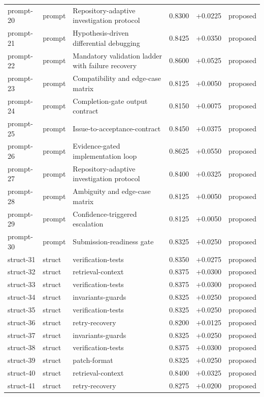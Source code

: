 \begin{center}
\begin{longtable}{llp{5.2cm}rrl}
prompt-20 & prompt & Repository-adaptive investigation protocol & 0.8300 & +0.0225 & proposed \\
prompt-21 & prompt & Hypothesis-driven differential debugging & 0.8425 & +0.0350 & proposed \\
prompt-22 & prompt & Mandatory validation ladder with failure recovery & 0.8600 & +0.0525 & proposed \\
prompt-23 & prompt & Compatibility and edge-case matrix & 0.8125 & +0.0050 & proposed \\
prompt-24 & prompt & Completion-gate output contract & 0.8150 & +0.0075 & proposed \\
prompt-25 & prompt & Issue-to-acceptance-contract & 0.8450 & +0.0375 & proposed \\
prompt-26 & prompt & Evidence-gated implementation loop & 0.8625 & +0.0550 & proposed \\
prompt-27 & prompt & Repository-adaptive investigation protocol & 0.8400 & +0.0325 & proposed \\
prompt-28 & prompt & Ambiguity and edge-case matrix & 0.8125 & +0.0050 & proposed \\
prompt-29 & prompt & Confidence-triggered escalation & 0.8125 & +0.0050 & proposed \\
prompt-30 & prompt & Submission-readiness gate & 0.8325 & +0.0250 & proposed \\
struct-31 & struct & verification-tests & 0.8350 & +0.0275 & proposed \\
struct-32 & struct & retrieval-context & 0.8375 & +0.0300 & proposed \\
struct-33 & struct & verification-tests & 0.8375 & +0.0300 & proposed \\
struct-34 & struct & invariants-guards & 0.8325 & +0.0250 & proposed \\
struct-35 & struct & verification-tests & 0.8325 & +0.0250 & proposed \\
struct-36 & struct & retry-recovery & 0.8200 & +0.0125 & proposed \\
struct-37 & struct & invariants-guards & 0.8325 & +0.0250 & proposed \\
struct-38 & struct & verification-tests & 0.8375 & +0.0300 & proposed \\
struct-39 & struct & patch-format & 0.8325 & +0.0250 & proposed \\
struct-40 & struct & retrieval-context & 0.8400 & +0.0325 & proposed \\
struct-41 & struct & retry-recovery & 0.8275 & +0.0200 & proposed \\

\end{longtable}
\end{center}

